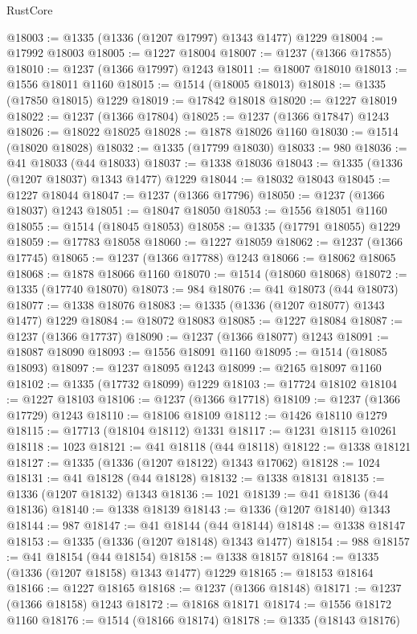 \begin{lexlean}{RustCore}
\begin{coremodule}
@18003 := @1335 (@1336 (@1207 @17997) @1343 @1477) @1229
@18004 := @17992 @18003
@18005 := @1227 @18004
@18007 := @1237 (@1366 @17855)
@18010 := @1237 (@1366 @17997) @1243
@18011 := @18007 @18010
@18013 := @1556 @18011 @1160
@18015 := @1514 (@18005 @18013)
@18018 := @1335 (@17850 @18015) @1229
@18019 := @17842 @18018
@18020 := @1227 @18019
@18022 := @1237 (@1366 @17804)
@18025 := @1237 (@1366 @17847) @1243
@18026 := @18022 @18025
@18028 := @1878 @18026 @1160
@18030 := @1514 (@18020 @18028)
@18032 := @1335 (@17799 @18030)
@18033 := 980
@18036 := @41 @18033 (@44 @18033)
@18037 := @1338 @18036
@18043 := @1335 (@1336 (@1207 @18037) @1343 @1477) @1229
@18044 := @18032 @18043
@18045 := @1227 @18044
@18047 := @1237 (@1366 @17796)
@18050 := @1237 (@1366 @18037) @1243
@18051 := @18047 @18050
@18053 := @1556 @18051 @1160
@18055 := @1514 (@18045 @18053)
@18058 := @1335 (@17791 @18055) @1229
@18059 := @17783 @18058
@18060 := @1227 @18059
@18062 := @1237 (@1366 @17745)
@18065 := @1237 (@1366 @17788) @1243
@18066 := @18062 @18065
@18068 := @1878 @18066 @1160
@18070 := @1514 (@18060 @18068)
@18072 := @1335 (@17740 @18070)
@18073 := 984
@18076 := @41 @18073 (@44 @18073)
@18077 := @1338 @18076
@18083 := @1335 (@1336 (@1207 @18077) @1343 @1477) @1229
@18084 := @18072 @18083
@18085 := @1227 @18084
@18087 := @1237 (@1366 @17737)
@18090 := @1237 (@1366 @18077) @1243
@18091 := @18087 @18090
@18093 := @1556 @18091 @1160
@18095 := @1514 (@18085 @18093)
@18097 := @1237 @18095 @1243
@18099 := @2165 @18097 @1160
@18102 := @1335 (@17732 @18099) @1229
@18103 := @17724 @18102
@18104 := @1227 @18103
@18106 := @1237 (@1366 @17718)
@18109 := @1237 (@1366 @17729) @1243
@18110 := @18106 @18109
@18112 := @1426 @18110 @1279
@18115 := @17713 (@18104 @18112) @1331
@18117 := @1231 @18115 @10261
@18118 := 1023
@18121 := @41 @18118 (@44 @18118)
@18122 := @1338 @18121
@18127 := @1335 (@1336 (@1207 @18122) @1343 @17062)
@18128 := 1024
@18131 := @41 @18128 (@44 @18128)
@18132 := @1338 @18131
@18135 := @1336 (@1207 @18132) @1343
@18136 := 1021
@18139 := @41 @18136 (@44 @18136)
@18140 := @1338 @18139
@18143 := @1336 (@1207 @18140) @1343
@18144 := 987
@18147 := @41 @18144 (@44 @18144)
@18148 := @1338 @18147
@18153 := @1335 (@1336 (@1207 @18148) @1343 @1477)
@18154 := 988
@18157 := @41 @18154 (@44 @18154)
@18158 := @1338 @18157
@18164 := @1335 (@1336 (@1207 @18158) @1343 @1477) @1229
@18165 := @18153 @18164
@18166 := @1227 @18165
@18168 := @1237 (@1366 @18148)
@18171 := @1237 (@1366 @18158) @1243
@18172 := @18168 @18171
@18174 := @1556 @18172 @1160
@18176 := @1514 (@18166 @18174)
@18178 := @1335 (@18143 @18176)

\end{coremodule}
\end{lexlean}
